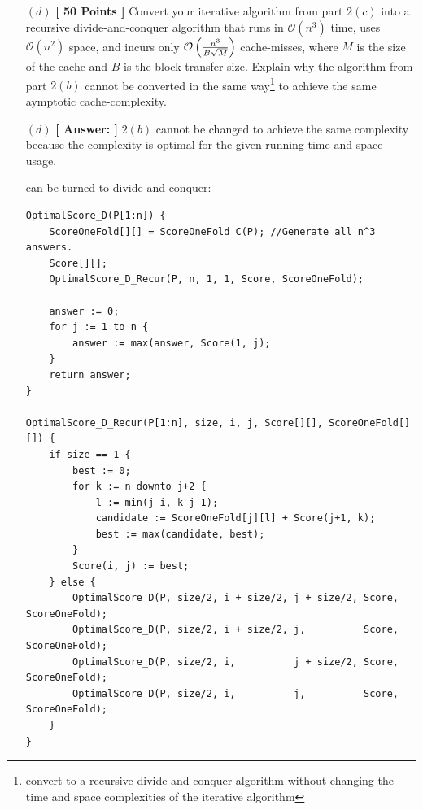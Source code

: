 \documentclass[11pt]{article}
\newcommand{\Oh}[1]{{\mathcal O}\left({#1}\right)}
\def\func#1{\mbox{\textrm{\bf{\sc{#1}}}}}
\begin{document}
\begin{itemize}
    \item[$(d)$] {\bf{[ 50 Points ]}} Convert your iterative algorithm from part $2(c)$
        into a recursive divide-and-conquer algorithm that runs in $\Oh{n^3}$ time, uses
        $\Oh{n^2}$ space, and incurs only $\Oh{{n^3 \over {B\sqrt{M}}}}$ cache-misses,
        where $M$ is the size of the cache and $B$ is the block transfer size. 
        Explain why the algorithm from part $2(b)$ cannot be converted
        in the same way\footnote{convert to a recursive divide-and-conquer algorithm
            without changing the time and space complexities of the
        iterative algorithm} to achieve the same aymptotic cache-complexity.

    \item[$(d)$] {\bf{[ Answer: ]}}
        $2(b)$ cannot be changed to achieve the same complexity because the complexity is optimal for the given running time and space usage.

        \func{ScoreOneFold\_C} can be turned to divide and conquer:
        \begin{verbatim}
OptimalScore_D(P[1:n]) {
    ScoreOneFold[][] = ScoreOneFold_C(P); //Generate all n^3 answers.
    Score[][];
    OptimalScore_D_Recur(P, n, 1, 1, Score, ScoreOneFold);

    answer := 0;
    for j := 1 to n {
        answer := max(answer, Score(1, j);
    }
    return answer;
}

OptimalScore_D_Recur(P[1:n], size, i, j, Score[][], ScoreOneFold[][]) {
    if size == 1 {
        best := 0;
        for k := n downto j+2 {
            l := min(j-i, k-j-1);
            candidate := ScoreOneFold[j][l] + Score(j+1, k);
            best := max(candidate, best);
        }
        Score(i, j) := best;
    } else {
        OptimalScore_D(P, size/2, i + size/2, j + size/2, Score, ScoreOneFold);
        OptimalScore_D(P, size/2, i + size/2, j,          Score, ScoreOneFold);
        OptimalScore_D(P, size/2, i,          j + size/2, Score, ScoreOneFold);
        OptimalScore_D(P, size/2, i,          j,          Score, ScoreOneFold);
    }
}
        \end{verbatim}

\end{itemize}
\end{document}
